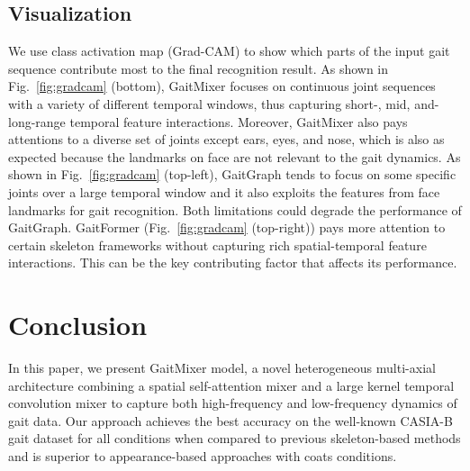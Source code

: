 \documentclass{article}
\begin{document}
\subsection{Visualization}
We use class activation map (Grad-CAM) \cite{Grad-CAM} to show which parts of the input gait sequence contribute most to the final recognition result. As shown in Fig.~\ref{fig:gradcam} (bottom),  GaitMixer focuses on continuous joint sequences with a variety of different temporal windows, thus capturing short-, mid, and- long-range temporal feature interactions. Moreover, GaitMixer also pays attentions to a diverse set of joints except ears, eyes, and nose, which is also as expected because the landmarks on face are not relevant to the gait dynamics. As shown in  Fig.~\ref{fig:gradcam} (top-left),  GaitGraph tends to focus on some specific joints over a large temporal window and it also exploits the features from face landmarks for gait recognition. Both limitations could degrade the performance of GaitGraph. GaitFormer (Fig.~\ref{fig:gradcam} (top-right)) pays more attention to certain skeleton frameworks without capturing rich spatial-temporal feature interactions. This can be the key contributing factor that affects its performance.  

 



\section{Conclusion}
In this paper, we present GaitMixer model, a novel heterogeneous multi-axial architecture combining a spatial self-attention mixer and a large kernel temporal convolution mixer to capture both high-frequency and low-frequency dynamics of gait data. Our approach achieves the best accuracy on the well-known CASIA-B gait dataset for all conditions when compared to previous skeleton-based methods and is superior to appearance-based approaches with coats conditions.

























\end{document}
